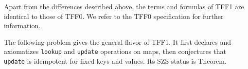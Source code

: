 %
%
%
%

 Apart from the differences described above,
the terms and formulas of TFF1 are identical to those of TFF0. We refer to the
TFF0 specification \cite{sutcliffe-et-al-2011-tff0} for further information.

 The following problem gives the general flavor of TFF1.
It first declares and axiomatizes {\tt lookup} and {\tt update} operations on
maps, then conjectures that {\tt update} is idempotent for fixed keys and
values. Its SZS status \cite{sutcliffe-2008-szs} is Theorem.

